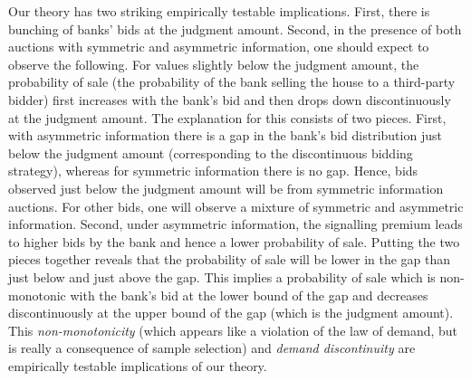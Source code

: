 \documentclass[11pt,twopage]{article}
\begin{document}
Our theory has two striking empirically testable implications. First,
there is bunching of banks' bids at the judgment amount. 
Second, in the presence of both auctions with symmetric and
asymmetric information, one should expect to observe the
following. For values slightly below the judgment amount, the
probability of sale (the probability of the bank selling the house to
a third-party bidder) first increases with the bank's bid and then
drops down discontinuously at the judgment amount. The explanation for
this consists of two pieces. First, with asymmetric information there
is a gap in the bank's bid distribution just below the judgment amount
(corresponding to the discontinuous bidding strategy), whereas for
symmetric information there is no gap. Hence, bids observed just below
the judgment amount will be from symmetric information auctions. For
other bids, one will observe a mixture of symmetric and asymmetric
information. Second, under asymmetric
information, the signalling premium leads to higher bids by
the bank and hence a lower probability of sale. Putting the two pieces
together reveals that the probability of sale will be lower in the gap
than just below and just above the gap. This implies a probability of
sale which is non-monotonic with the bank's bid at the lower bound of
the gap and decreases discontinuously at the upper bound of the gap
(which is the judgment amount).
  This \emph{non-monotonicity} (which appears like a
violation of the law of demand, but is really a consequence of sample selection) and \emph{demand discontinuity} are
empirically testable implications of our theory.
\end{document}
